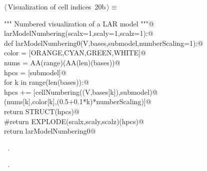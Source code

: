 \documentclass[11pt,oneside]{article}    %
\begin{document}
\begin{flushleft} \small \label{scrap33}
\protect{}$\langle\,$Visualization of cell indices\nobreak\ {\footnotesize 20b}$\,\rangle\equiv$
\vspace{-1ex}
\begin{list}{}{} \item
\mbox{}\verb@""" Numbered visualization of a LAR model """@\\
\mbox{}\verb@def larModelNumbering(scalx=1,scaly=1,scalz=1):@\\
\mbox{}\verb@    def  larModelNumbering0(V,bases,submodel,numberScaling=1):@\\
\mbox{}\verb@        color = [ORANGE,CYAN,GREEN,WHITE]@\\
\mbox{}\verb@        nums = AA(range)(AA(len)(bases))@\\
\mbox{}\verb@        hpcs = [submodel]@\\
\mbox{}\verb@        for k in range(len(bases)):@\\
\mbox{}\verb@            hpcs += [cellNumbering((V,bases[k]),submodel)@\\
\mbox{}\verb@                        (nums[k],color[k],(0.5+0.1*k)*numberScaling)]@\\
\mbox{}\verb@        return STRUCT(hpcs)@\\
\mbox{}\verb@        #return EXPLODE(scalx,scaly,scalz)(hpcs)@\\
\mbox{}\verb@    return larModelNumbering0@\\
\mbox{}\verb@@{\NWsep}
\end{list}
\vspace{-1ex}
\footnotesize\addtolength{\baselineskip}{-1ex}
\begin{list}{}{\setlength{\itemsep}{-\parsep}\setlength{\itemindent}{-\leftmargin}}
\item \NWtxtMacroDefBy\ .
\item \NWtxtMacroRefIn\ .
\end{list}
\end{flushleft}
\end{document}

